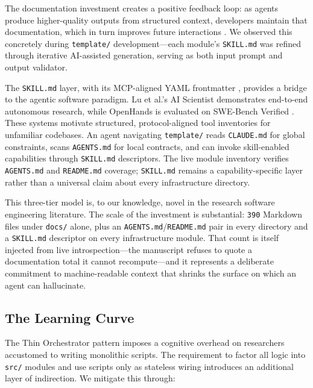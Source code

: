 \documentclass[
  english,
]{article}
\begin{document}
The documentation investment creates a positive feedback loop: as agents
produce higher-quality outputs from structured context, developers
maintain that documentation, which in turn improves future interactions
\citep{lau2025aicoding}. We observed this concretely during
\texttt{template/} development---each module's \texttt{SKILL.md} was
refined through iterative AI-assisted generation, serving as both input
prompt and output validator.

The \texttt{SKILL.md} layer, with its MCP-aligned YAML frontmatter
\citep{anthropic2024mcp}, provides a bridge to the agentic software
paradigm. Lu et al.'s AI Scientist \citep{lu2024aiscientist}
demonstrates end-to-end autonomous research, while OpenHands is
evaluated on SWE-Bench Verified
\citep{wang2024opendevin, jimenez2024swebench}. These systems motivate
structured, protocol-aligned tool inventories for unfamiliar codebases.
An agent navigating \texttt{template/} reads \texttt{CLAUDE.md} for
global constraints, scans \texttt{AGENTS.md} for local contracts, and
can invoke skill-enabled capabilities through \texttt{SKILL.md}
descriptors. The live module inventory verifies \texttt{AGENTS.md} and
\texttt{README.md} coverage; \texttt{SKILL.md} remains a
capability-specific layer rather than a universal claim about every
infrastructure directory.

This three-tier model is, to our knowledge, novel in the research
software engineering literature. The scale of the investment is
substantial: \texttt{390} Markdown files under \texttt{docs/} alone,
plus an \texttt{AGENTS.md}/\texttt{README.md} pair in every directory
and a \texttt{SKILL.md} descriptor on every infrastructure module. That
count is itself injected from live introspection---the manuscript
refuses to quote a documentation total it cannot recompute---and it
represents a deliberate commitment to machine-readable context that
shrinks the surface on which an agent can hallucinate.

\subsection{The Learning Curve}\label{the-learning-curve}

The Thin Orchestrator pattern imposes a cognitive overhead on
researchers accustomed to writing monolithic scripts. The requirement to
factor all logic into \texttt{src/} modules and use scripts only as
stateless wiring introduces an additional layer of indirection. We
mitigate this through:
\end{document}
